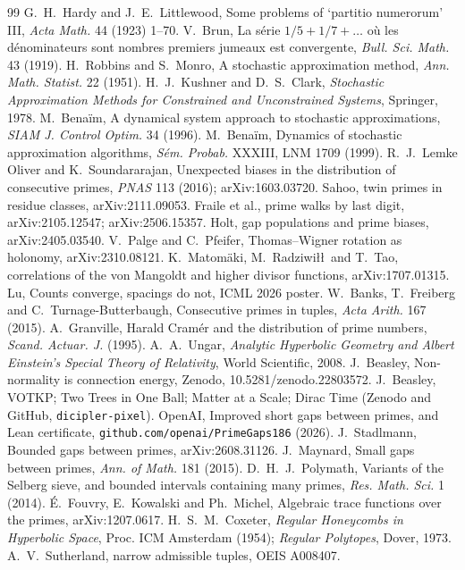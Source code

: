 \documentclass[11pt]{article}
\theoremstyle{definition}
\theoremstyle{remark}
\begin{document}
\begin{thebibliography}{99}\small
{} G.~H.~Hardy and J.~E.~Littlewood, Some problems of `partitio numerorum' III, \emph{Acta Math.} 44 (1923) 1--70.
 V.~Brun, La s\'erie $1/5+1/7+\dots$ o\`u les d\'enominateurs sont nombres premiers jumeaux est convergente, \emph{Bull. Sci. Math.} 43 (1919).
 H.~Robbins and S.~Monro, A stochastic approximation method, \emph{Ann. Math. Statist.} 22 (1951).
 H.~J.~Kushner and D.~S.~Clark, \emph{Stochastic Approximation Methods for Constrained and Unconstrained Systems}, Springer, 1978.
 M.~Bena\"im, A dynamical system approach to stochastic approximations, \emph{SIAM J. Control Optim.} 34 (1996).
 M.~Bena\"im, Dynamics of stochastic approximation algorithms, \emph{S\'em. Probab.} XXXIII, LNM 1709 (1999).
 R.~J.~Lemke Oliver and K.~Soundararajan, Unexpected biases in the distribution of consecutive primes, \emph{PNAS} 113 (2016); arXiv:1603.03720.
 Sahoo, twin primes in residue classes, arXiv:2111.09053.
 Fraile et al., prime walks by last digit, arXiv:2105.12547; arXiv:2506.15357.
 Holt, gap populations and prime biases, arXiv:2405.03540.
 V.~Palge and C.~Pfeifer, Thomas--Wigner rotation as holonomy, arXiv:2310.08121.
 K.~Matom\"aki, M.~Radziwi\l\l\ and T.~Tao, correlations of the von Mangoldt and higher divisor functions, arXiv:1707.01315.
 Lu, Counts converge, spacings do not, ICML 2026 poster.
 W.~Banks, T.~Freiberg and C.~Turnage-Butterbaugh, Consecutive primes in tuples, \emph{Acta Arith.} 167 (2015).
 A.~Granville, Harald Cram\'er and the distribution of prime numbers, \emph{Scand. Actuar. J.} (1995).
 A.~A.~Ungar, \emph{Analytic Hyperbolic Geometry and Albert Einstein's Special Theory of Relativity}, World Scientific, 2008.
 J.~Beasley, Non-normality is connection energy, Zenodo, 10.5281/zenodo.22803572.
 J.~Beasley, VOTKP; Two Trees in One Ball; Matter at a Scale; Dirac Time (Zenodo and GitHub, \texttt{dicipler-pixel}).
 OpenAI, Improved short gaps between primes, and Lean certificate, \texttt{github.com/openai/PrimeGaps186} (2026).
 J.~Stadlmann, Bounded gaps between primes, arXiv:2608.31126.
 J.~Maynard, Small gaps between primes, \emph{Ann. of Math.} 181 (2015).
 D.~H.~J.~Polymath, Variants of the Selberg sieve, and bounded intervals containing many primes, \emph{Res. Math. Sci.} 1 (2014).
 \'E.~Fouvry, E.~Kowalski and Ph.~Michel, Algebraic trace functions over the primes, arXiv:1207.0617.
 H.~S.~M.~Coxeter, \emph{Regular Honeycombs in Hyperbolic Space}, Proc. ICM Amsterdam (1954); \emph{Regular Polytopes}, Dover, 1973.
 A.~V.~Sutherland, narrow admissible tuples, OEIS A008407.
\end{thebibliography}
\end{document}
